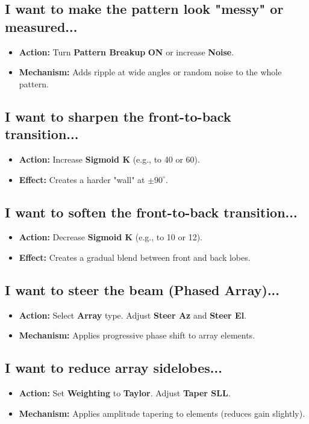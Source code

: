 \documentclass[11pt,a4paper]{article}
\begin{document}
\subsection{I want to make the pattern look "messy" or measured...}
\begin{itemize}
    \item \textbf{Action:} Turn \textbf{Pattern Breakup} \textbf{ON} or increase \textbf{Noise}.
    \item \textbf{Mechanism:} Adds ripple at wide angles or random noise to the whole pattern.
\end{itemize}

\subsection{I want to sharpen the front-to-back transition...}
\begin{itemize}
    \item \textbf{Action:} Increase \textbf{Sigmoid K} (e.g., to 40 or 60).
    \item \textbf{Effect:} Creates a harder "wall" at $\pm 90^\circ$.
\end{itemize}

\subsection{I want to soften the front-to-back transition...}
\begin{itemize}
    \item \textbf{Action:} Decrease \textbf{Sigmoid K} (e.g., to 10 or 12).
    \item \textbf{Effect:} Creates a gradual blend between front and back lobes.
\end{itemize}

\subsection{I want to steer the beam (Phased Array)...}
\begin{itemize}
    \item \textbf{Action:} Select \textbf{Array} type. Adjust \textbf{Steer Az} and \textbf{Steer El}.
    \item \textbf{Mechanism:} Applies progressive phase shift to array elements.
\end{itemize}

\subsection{I want to reduce array sidelobes...}
\begin{itemize}
    \item \textbf{Action:} Set \textbf{Weighting} to \textbf{Taylor}. Adjust \textbf{Taper SLL}.
    \item \textbf{Mechanism:} Applies amplitude tapering to elements (reduces gain slightly).
\end{itemize}
\end{document}
